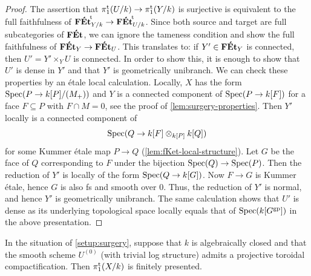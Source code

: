 \begin{proof}
The assertion that $\pi_1^{\mathrm{t}}(U/k)\to\pi_1^{\mathrm{t}}(Y/k)$ is surjective is equivalent to the full faithfulness of ${\mathbf{F\acute{E}t}}^{\!\mathrm{t}}_{Y/k}\to{\mathbf{F\acute{E}t}}^{\!\mathrm{t}}_{U/k}$. Since both source and target are full subcategories of $\mathbf{F\acute{E}t}$, we can ignore the tameness condition and show the full faithfulness of $\mathbf{F\acute{E}t}_Y\to\mathbf{F\acute{E}t}_U$. This translates to: if $Y'\in \mathbf{F\acute{E}t}_Y$ is connected, then $U' = Y'\times_Y U$ is connected. In order to show this, it is enough to show that $U'$ is dense in $Y'$ and that $Y'$ is geometrically unibranch. We can check these properties by an étale local calculation. Locally, $X$ has the form $\operatorname{Spec}(P\to k[P]/(M_+))$ and $Y$ is a connected component of $\operatorname{Spec}(P\to k[F])$ for a face $F \subseteq P$ with $F \cap M = 0$, see the proof of \cref{lem:surgery-properties}. Then $Y'$ locally is a connected component of  
\[
    \operatorname{Spec}(Q \to k[F]\otimes_{k[P]} k[Q])
\]
for some Kummer \'etale map $P \to Q$ (\cref{lem:fKet-local-structure}). Let $G$ be the face of $Q$ corresponding to $F$ under the bijection $\operatorname{Spec}(Q) \to \operatorname{Spec}(P)$. Then the reduction of $Y'$ is locally of the form $\operatorname{Spec}(Q \to k[G])$. Now $F \to G$ is Kummer \'etale, hence $G$ is also fs and smooth over $0$.
Thus, the reduction of $Y'$ is normal, and hence $Y'$ is geometrically unibranch. The same calculation shows that $U'$ is dense as its underlying topological space locally equals that of $\operatorname{Spec}(k[G^{\rm gp}])$ in the above presentation.
\end{proof}

\begin{cor} \label{cor:surgery-fp}
    In the situation of \cref{setup:surgery}, suppose that $k$ is algebraically closed and that the smooth scheme $U^{(0)}$ (with trivial log structure) admits a projective toroidal  compactification. Then $\pi_1^{\mathrm{t}}(X/k)$ is finitely presented. 
\end{cor}

